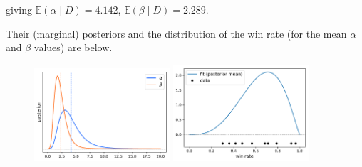 giving $\mathbb{E}(\alpha\;|\;D) = 4.142$, $\mathbb{E}(\beta\;|\;D) = 2.289$. 

\no Their (marginal) posteriors and the distribution of the win rate (for the mean $\alpha$ and $\beta$ values) are below.
\begin{figure}[h]
\centering
	\includegraphics[width=0.45\textwidth]{./figs/04-betabinom-ab.pdf}
	\includegraphics[width=0.45\textwidth]{./figs/04-betabinom-fit.pdf}
\end{figure}








